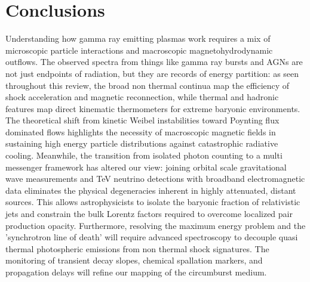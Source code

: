 \documentclass{aa} %
\begin{document}
\section{Conclusions} 
Understanding how gamma ray emitting plasmas work requires a mix of microscopic particle interactions and macroscopic magnetohydrodynamic outflows. The observed spectra from things like gamma ray bursts and AGNs are not just endpoints of radiation, but they are records of energy partition: as seen throughout this review, the broad non thermal continua map the efficiency of shock acceleration and magnetic reconnection, while thermal and hadronic features map direct kinematic thermometers for extreme baryonic environments. The theoretical shift from kinetic Weibel instabilities toward Poynting flux dominated flows highlights the necessity of macroscopic magnetic fields in sustaining high energy particle distributions against catastrophic radiative cooling.
Meanwhile, the transition from isolated photon counting to a multi messenger framework has altered our view: joining orbital scale gravitational wave measurements and TeV neutrino detections with broadband electromagnetic data eliminates the physical degeneracies inherent in highly attenuated, distant sources. This allows astrophysicists to isolate the baryonic fraction of relativistic jets and constrain the bulk Lorentz factors required to overcome localized pair production opacity.
Furthermore, resolving the maximum energy problem and the 'synchrotron line of death' will require advanced spectroscopy to decouple quasi thermal photospheric emissions from non thermal shock signatures. The monitoring of transient decay slopes, chemical spallation markers, and propagation delays will refine our mapping of the circumburst medium. 


 


\clearpage
\end{document}
